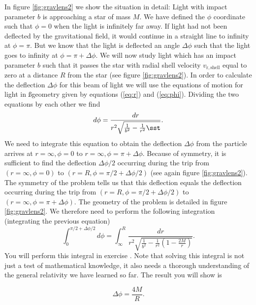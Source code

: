 {\begin{multicols}{2}
In figure \ref{fig:gravlens2} we show the situation in detail: Light with impact parameter $b$ is approaching a star of mass $M$. We have defined the $\phi$ coordinate such that $\phi=0$ when the light is infinitely far away. If light had not been deflected by the gravitational field, it would continue in a straight line to infinity at $\phi=\pi$. But we know that the light is deflected an angle $\Delta\phi$ such that the light goes to infinity at $\phi=\pi+\Delta\phi$. We will now study light which has an impact parameter $b$ such that it passes the star with radial shell velocity $v_\mathrm{r,shell}$ equal to zero at a distance $R$ from the star (see figure \ref{fig:gravlens2}). In order to calculate the deflection $\Delta\phi$ for this beam of light we will use the equations of motion for light in \ss geometry given by equations (\ref{eq:r}) and (\ref{eq:phi}). Dividing the two equations by each other we find
\[
d\phi=\frac{dr}{r^2\sqrt{\frac{1}{b^2}-\frac{1}{r^2}\sst}}.
\]
We need to integrate this equation to obtain the deflection $\Delta\phi$ from the particle arrives at $r=\infty,\phi=0$ to $r=\infty,\phi=\pi+\Delta\phi$. Because of symmetry, it is sufficient to find the deflection $\Delta\phi/2$ occurring during the trip from $(r=\infty,\phi=0)$ to $(r=R,\phi=\pi/2+\Delta\phi/2)$ (see again figure \ref{fig:gravlens2}). The symmetry of the problem tells us that this deflection equals the deflection occurring during the trip from $(r=R,\phi=\pi/2+\Delta\phi/2)$ to $(r=\infty,\phi=\pi+\Delta\phi)$. The geometry of the problem is detailed in figure \ref{fig:gravlens2}. We therefore need to perform the following integration (integrating the previous equation)
\begin{equation}
\label{eq:defintegral}
\int_0^{\pi/2+\Delta\phi/2}d\phi=\int_{\infty}^R\frac{dr}{r^2\sqrt{\frac{1}{b^2}-\frac{1}{r^2}\left(1-\frac{2M}{r}\right)}}.
\end{equation}
You will perform this integral in exercise . Note that solving this integral is not just a test of mathematical knowledge, it also needs a thorough understanding of the general relativity we have learned so far. The result you will show is
\begin{formbox}
\begin{equation}
\label{eq:deflection}
\Delta\phi=\frac{4M}{R}.
\end{equation}
\end{formbox}



\end{multicols}}

